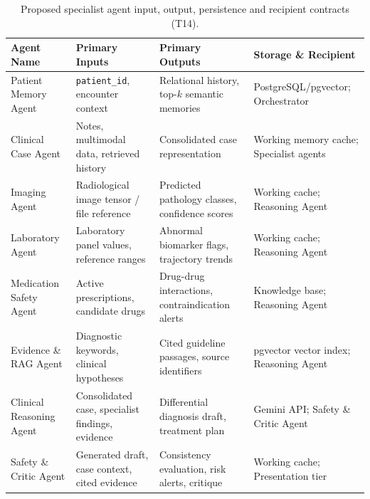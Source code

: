 \begin{table}[htbp]
\centering
\small
\caption{Proposed specialist agent input, output, persistence and recipient contracts (T14).}
\label{tab:esha:contracts}
\begin{tabular}{|p{}|p{}|p{}|p{}|}
\hline
Agent Name & Primary Inputs & Primary Outputs & Storage \& Recipient \\ \hline
Patient Memory Agent & \texttt{patient\_id}, encounter context & Relational history, top-$k$ semantic memories & PostgreSQL/pgvector; Orchestrator \\ \hline
Clinical Case Agent & Notes, multimodal data, retrieved history & Consolidated case representation & Working memory cache; Specialist agents \\ \hline
Imaging Agent & Radiological image tensor / file reference & Predicted pathology classes, confidence scores & Working cache; Reasoning Agent \\ \hline
Laboratory Agent & Laboratory panel values, reference ranges & Abnormal biomarker flags, trajectory trends & Working cache; Reasoning Agent \\ \hline
Medication Safety Agent & Active prescriptions, candidate drugs & Drug-drug interactions, contraindication alerts & Knowledge base; Reasoning Agent \\ \hline
Evidence \& RAG Agent & Diagnostic keywords, clinical hypotheses & Cited guideline passages, source identifiers & pgvector vector index; Reasoning Agent \\ \hline
Clinical Reasoning Agent & Consolidated case, specialist findings, evidence & Differential diagnosis draft, treatment plan & Gemini API; Safety \& Critic Agent \\ \hline
Safety \& Critic Agent & Generated draft, case context, cited evidence & Consistency evaluation, risk alerts, critique & Working cache; Presentation tier \\ \hline
\end{tabular}
\end{table}

